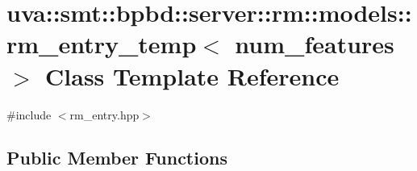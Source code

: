 \hypertarget{classuva_1_1smt_1_1bpbd_1_1server_1_1rm_1_1models_1_1rm__entry__temp}{}\section{uva\+:\+:smt\+:\+:bpbd\+:\+:server\+:\+:rm\+:\+:models\+:\+:rm\+\_\+entry\+\_\+temp$<$ num\+\_\+features $>$ Class Template Reference}
\label{classuva_1_1smt_1_1bpbd_1_1server_1_1rm_1_1models_1_1rm__entry__temp}


{\ttfamily \#include $<$rm\+\_\+entry.\+hpp$>$}

\subsection*{Public Member Functions}

